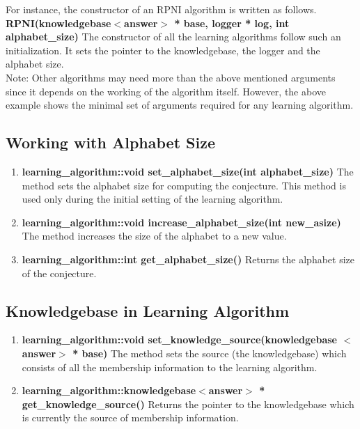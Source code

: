 For instance, the constructor of an RPNI algorithm is written as follows. \vskip 1pt
\textbf{RPNI(knowledgebase$<$answer$>$ * base, logger * log, int alphabet\_size)} \vskip 1pt
The constructor of all the learning algorithms follow such an initialization. It sets the pointer to the knowledgebase, the logger and the alphabet size. \\
Note: Other algorithms may need more than the above mentioned arguments since it depends on the working of the algorithm itself. However, the above example shows the minimal set of arguments required for any learning algorithm. 

\subsection*{Working with Alphabet Size}

\begin{enumerate}
 \item \textbf{learning\_algorithm::void set\_alphabet\_size(int alphabet\_size)} \vskip 1pt
	The method sets the alphabet size for computing the conjecture. This method is used only during the initial setting of the learning algorithm. 

 \item \textbf{learning\_algorithm::void increase\_alphabet\_size(int new\_asize)} \vskip 1pt
	The method increases the size of the alphabet to a new value.

 \item \textbf{learning\_algorithm::int get\_alphabet\_size()} \vskip 1pt
	Returns the alphabet size of the conjecture.
\end{enumerate}

\subsection*{Knowledgebase in Learning Algorithm}

\begin{enumerate}

 \item \textbf{learning\_algorithm::void set\_knowledge\_source(knowledgebase $<$answer$>$ * base)} \vskip 1pt
	The method sets the source (the knowledgebase) which consists of all the membership information to the learning algorithm.

 \item \textbf{learning\_algorithm::knowledgebase$<$answer$>$ * get\_knowledge\_source()} \vskip 1pt
	Returns the pointer to the knowledgebase which is currently the source of membership information.

\end{enumerate}

